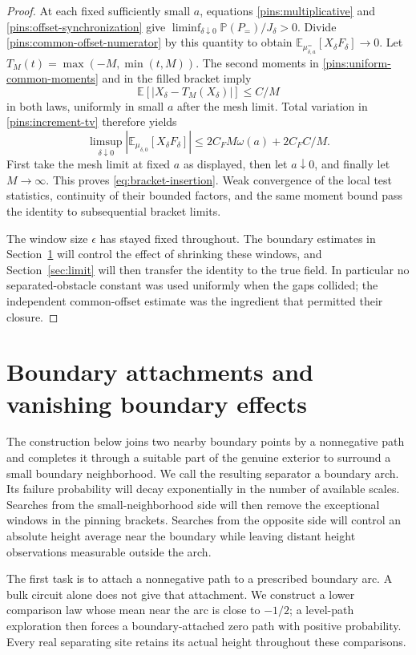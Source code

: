 \documentclass[11pt]{article}
\theoremstyle{definition}
\theoremstyle{remark}
\numberwithin{equation}{section}
\begin{document}
\begin{proof}
At each fixed sufficiently small $a$, equations
\eqref{pins:multiplicative} and \eqref{pins:offset-synchronization}
give $\liminf_{\delta\downarrow0}\mathbb P(P_=)/J_\delta>0$.
Divide \eqref{pins:common-offset-numerator} by this quantity to obtain
$\mathbb E_{\mu_{\delta,a}^{=}}[X_\delta F_\delta]\to0$.
Let $T_M(t)=\max(-M,\min(t,M))$.  The second moments in
\eqref{pins:uniform-common-moments} and in the filled bracket imply
\[
 \mathbb E[|X_\delta-T_M(X_\delta)|]\le C/M
\]
in both laws, uniformly in small $a$ after the mesh limit.  Total
variation in \eqref{pins:increment-tv} therefore yields
\[
 \limsup_{\delta\downarrow0}
       |\mathbb E_{\mu_{\delta,0}}[X_\delta F_\delta]|
 \le 2C_F M\omega(a)+2C_F C/M.
\]
First take the mesh limit at fixed $a$ as displayed, then let
$a\downarrow0$, and finally let $M\to\infty$.  This proves
\eqref{eq:bracket-insertion}.  Weak convergence of the local test
statistics, continuity of their bounded factors, and the same moment
bound pass the identity to subsequential bracket limits.

The window size $\epsilon$ has stayed fixed throughout.  The boundary
estimates in Section~\ref{sec:boundary} will control the effect of
shrinking these windows, and Section~\ref{sec:limit} will then transfer
the identity to the true field.
In particular no separated-obstacle constant was used uniformly when
the gaps collided; the independent common-offset estimate was the
ingredient that permitted their closure.
\end{proof}

\section{Boundary attachments and vanishing boundary effects}
\label{sec:boundary}

The construction below joins two nearby boundary points by a nonnegative
path and completes it through a suitable part of the genuine exterior
to surround a small boundary neighborhood.  We call the resulting
separator a boundary arch.  Its failure probability will decay
exponentially in the number of available scales.  Searches from the
small-neighborhood side will then remove the exceptional windows in the
pinning brackets.  Searches from the opposite side will control an
absolute height average near the boundary while leaving distant height
observations measurable outside the arch.

The first task is to attach a nonnegative path to a prescribed boundary
arc.  A bulk circuit alone does not give that attachment.  We construct
a lower comparison law whose mean near the arc is close to $-1/2$;
a level-path exploration then forces a boundary-attached zero path with
positive probability.  Every real separating site retains its actual
height throughout these comparisons.
\end{document}
